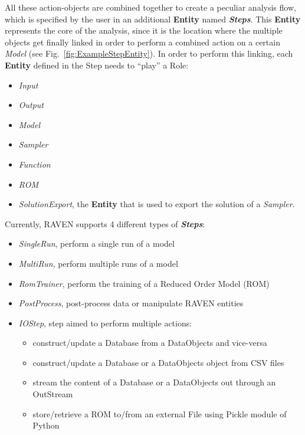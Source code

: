 All these action-objects are combined together to create a peculiar analysis flow, which is specified
by the user in an additional \textbf{Entity} named \textit{\textbf{Steps}}. This \textbf{Entity} represents the core of the analysis, since it is the location where the multiple objects get finally linked in order to perform a combined action on a certain \textit{Model} (see Fig.~\ref{fig:ExampleStepEntity}). In order to perform this linking, each \textbf{Entity} defined in the Step needs to ``play'' a Role:
\begin{itemize}
  \item \textit{Input}
  \item \textit{Output}
  \item \textit{Model}
  \item \textit{Sampler}
  \item \textit{Function}
  \item \textit{ROM}
  \item \textit{SolutionExport}, the \textbf{Entity} that is used to export the solution of a \textit{Sampler}.
\end{itemize}
Currently, RAVEN supports 4 different types of \textit{\textbf{Steps}}:
\begin{itemize}
  \item \textit{SingleRun}, perform a single run of a model
  \item \textit{MultiRun}, perform multiple runs of a model
  \item \textit{RomTrainer}, perform the training of a Reduced Order Model (ROM)
  \item \textit{PostProcess}, post-process data or manipulate RAVEN entities
  \item \textit{IOStep}, step aimed to perform multiple actions:
  \begin{itemize}
    \item construct/update a Database from a DataObjects and vice-versa
    \item construct/update a Database or a DataObjects object from CSV files
    \item stream the content of a Database or a DataObjects out through an OutStream
    \item store/retrieve a ROM to/from an external File using Pickle module of Python
  \end{itemize}
\end{itemize}


